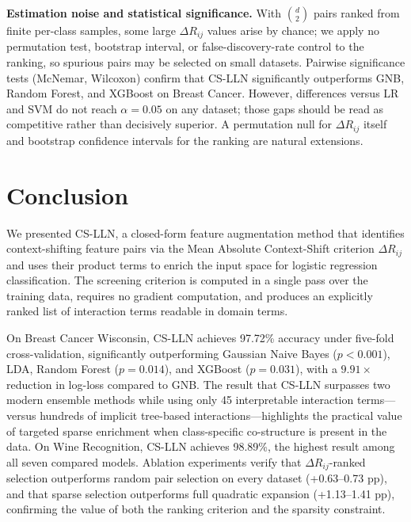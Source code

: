 \documentclass[conference]{IEEEtran}
\begin{document}
\noindent\textbf{Estimation noise and statistical significance.}
With $\binom{d}{2}$ pairs ranked from finite per-class samples, some large
$\Delta R_{ij}$ values arise by chance; we apply no permutation test,
bootstrap interval, or false-discovery-rate control to the ranking, so
spurious pairs may be selected on small datasets.
Pairwise significance tests (McNemar, Wilcoxon) confirm that CS-LLN
significantly outperforms GNB, Random Forest, and XGBoost on Breast Cancer.
However, differences versus LR and SVM do not reach $\alpha = 0.05$ on any
dataset; those gaps should be read as competitive rather than decisively
superior.
A permutation null for $\Delta R_{ij}$ itself and bootstrap confidence
intervals for the ranking are natural extensions.

\section{Conclusion}
\label{sec:conc}

We presented CS-LLN, a closed-form feature augmentation method that
identifies context-shifting feature pairs via the Mean Absolute Context-Shift
criterion $\Delta R_{ij}$ and uses their product terms to enrich the input
space for logistic regression classification.
The screening criterion is computed in a single pass over the training data,
requires no gradient computation, and produces an explicitly ranked list of
interaction terms readable in domain terms.

On Breast Cancer Wisconsin, CS-LLN achieves 97.72\% accuracy under
five-fold cross-validation, significantly outperforming Gaussian Naive Bayes
($p < 0.001$), LDA, Random Forest ($p = 0.014$), and XGBoost ($p = 0.031$),
with a $9.91\times$ reduction in log-loss compared to GNB.
The result that CS-LLN surpasses two modern ensemble methods while using only
45 interpretable interaction terms---versus hundreds of implicit tree-based
interactions---highlights the practical value of targeted sparse enrichment
when class-specific co-structure is present in the data.
On Wine Recognition, CS-LLN achieves 98.89\%, the highest result among all
seven compared models.
Ablation experiments verify that $\Delta R_{ij}$-ranked selection outperforms
random pair selection on every dataset (+0.63--0.73 pp), and that sparse
selection outperforms full quadratic expansion (+1.13--1.41 pp), confirming
the value of both the ranking criterion and the sparsity constraint.
\end{document}
